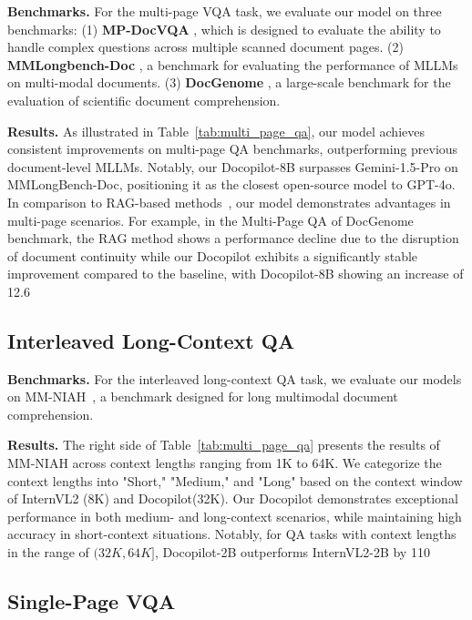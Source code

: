 \documentclass[10pt,twocolumn,letterpaper]{article}
\def\modelname{Docopilot\xspace}
\begin{document}
\begin{CJK}{UTF8}{gbsn}
\noindent\textbf{Benchmarks.} For the multi-page VQA task, we evaluate our model on three benchmarks:
(1) \textbf{MP-DocVQA} \cite{tito2023mpdocvqa}, 
which is designed to evaluate the ability to handle complex questions across multiple scanned document pages.
(2) \textbf{MMLongbench-Doc} \cite{ma2024mmlong}, a benchmark for evaluating the performance of MLLMs on multi-modal documents.
(3) \textbf{DocGenome} \cite{xia2024docgenome}, a large-scale benchmark for the evaluation of scientific document comprehension.


\noindent\textbf{Results.}
As illustrated in Table~\ref{tab:multi_page_qa}, our model achieves consistent improvements on multi-page QA benchmarks, outperforming previous document-level MLLMs.
Notably, our \modelname-8B surpasses Gemini-1.5-Pro \cite{reid2024gemini1_5} on MMLongBench-Doc, positioning it as the closest open-source model to GPT-4o. 
In comparison to RAG-based methods~\cite{yu2024visrag, cho2024m3docrag, wang2024mmniah}, our model demonstrates advantages in multi-page scenarios.
For example, in the Multi-Page QA of DocGenome benchmark, the RAG method shows a performance decline due to the disruption of document continuity while our \modelname exhibits a significantly stable improvement compared to the baseline, with \modelname-8B showing an increase of 12.6\

\subsection{Interleaved Long-Context QA}

\noindent\textbf{Benchmarks.}
For the interleaved long-context QA task, we evaluate our models on MM-NIAH~\cite{wang2024mmniah}, a benchmark designed for long multimodal document comprehension.

\noindent\textbf{Results.}
The right side of Table~\ref{tab:multi_page_qa} presents the results of MM-NIAH across context lengths ranging from 1K to 64K. We categorize the context lengths into "Short," "Medium," and "Long" based on the context window of InternVL2 (8K) and \modelname (32K). Our \modelname demonstrates exceptional performance in both medium- and long-context scenarios, while maintaining high accuracy in short-context situations. Notably, for QA tasks with context lengths in the range of $(32K, 64K]$, \modelname-2B outperforms InternVL2-2B by 110\

\subsection{Single-Page VQA}


\end{CJK}
\end{document}
